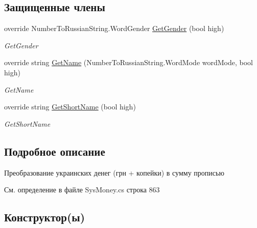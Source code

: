 \subsection*{Защищенные члены}
\begin{DoxyCompactItemize}
\item 
override Number\+To\+Russian\+String.\+Word\+Gender \mbox{\hyperlink{class_f_b_a_1_1_hryvna_to_string_provider_a7ba51229f701710f4aaa09db9cbfd3e4}{Get\+Gender}} (bool high)
\begin{DoxyCompactList}\small\item\em Get\+Gender \end{DoxyCompactList}\item 
override string \mbox{\hyperlink{class_f_b_a_1_1_hryvna_to_string_provider_a7e7f7d7ca730dcb617c9218ca91866ef}{Get\+Name}} (Number\+To\+Russian\+String.\+Word\+Mode word\+Mode, bool high)
\begin{DoxyCompactList}\small\item\em Get\+Name \end{DoxyCompactList}\item 
override string \mbox{\hyperlink{class_f_b_a_1_1_hryvna_to_string_provider_a6c6ffa9793f9d6ca8ee4b2fdc401e36a}{Get\+Short\+Name}} (bool high)
\begin{DoxyCompactList}\small\item\em Get\+Short\+Name \end{DoxyCompactList}\end{DoxyCompactItemize}


\subsection{Подробное описание}
Преобразование украинских денег (грн + копейки) в сумму прописью 



См. определение в файле Sys\+Money.\+cs строка 863



\subsection{Конструктор(ы)}
\mbox{\label{class_f_b_a_1_1_hryvna_to_string_provider_a23a15cbbae9ee5f5ac0b116493e119b0}} 
